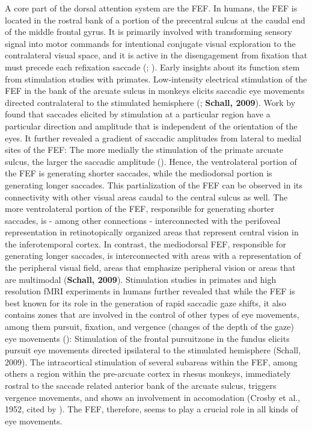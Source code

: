 \documentclass[a4paper, 12pt]{scrreprt}
\begin{document}
A core part of the dorsal attention system are the FEF. In humans, the FEF is located in the rostral bank of a portion of the precentral sulcus at the caudal end of the middle frontal gyrus. It is primarily involved with transforming sensory signal into motor commands for intentional conjugate visual exploration to the contralateral visual space, and it is active in the disengagement from fixation that must precede each refixation saccade (\cite{goodwin2007cranial}; \cite{tehovnik2000eye}). Early insights about its function stem from stimulation studies with primates. Low-intensity electrical stimulation of the FEF in the bank of the arcuate sulcus in monkeys elicits saccadic eye movements directed contralateral to the stimulated hemisphere (\cite{tehovnik2000eye}; \textbf{Schall, 2009}). Work by \textcite{bruce1985primate} found that saccades elicited by stimulation at a particular region have a particular direction and amplitude that is independent of the orientation of the eyes. It further revealed a gradient of saccadic amplitudes from lateral to medial sites of the FEF: The more medially the stimulation of the primate arcuate sulcus, the larger the saccadic amplitude (\cite{bruce1985primate}). Hence, the ventrolateral portion of the FEF is generating shorter saccades, while the mediodorsal portion is generating longer saccades. This partialization of the FEF can be observed in its connectivity with other visual areas caudal to the central sulcus as well. The more ventrolateral portion of the FEF, responsible for generating shorter saccades, is - among other connections - interconnected with the perifoveal representation in retinotopically organized areas that represent central vision in the inferotemporal cortex. In contrast, the mediodorsal FEF, responsible for generating longer saccades, is interconnected with areas with a representation of the peripheral visual field, areas that emphasize peripheral vision or areas that are multimodal (\textbf{Schall, 2009}).
Stimulation studies in primates and high resolution fMRI experiments in humans further revealed that while the FEF is best known for its role in the generation of rapid saccadic gaze shifts, it also contains zones that are involved in the  control of other types of eye movements, among them pursuit, fixation, and vergence (changes of the depth of the gaze) eye movements (\cite{krauzlis2014eye}): Stimulation of the frontal pursuitzone in the fundus elicits pursuit eye movements directed ipsilateral to the stimulated hemisphere (Schall, 2009). The intracortical stimulation of several subareas within the FEF, among others a region within the pre-arcuate cortex in rhesus monkeys, immediately rostral to the saccade related anterior bank of the arcuate sulcus, triggers vergence movements, and shows an involvement in accomodation (Crosby et al., 1952, cited by \textcite{vernet2014corrigendum}). The FEF, therefore, seems to play a crucial role in all kinds of eye movements. \newline
\end{document}
